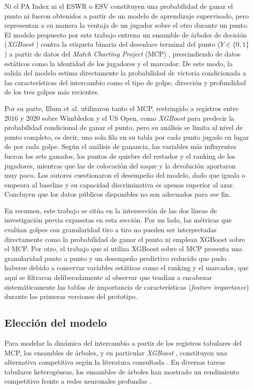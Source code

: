 \documentclass[journal]{IEEEtran}
\begin{document}
Ni el PA Index ni el ESWR o ESV constituyen una probabilidad de ganar el punto ni fueron obtenidos a partir de un modelo de aprendizaje supervisado, pero representan a su manera la ventaja de un jugador sobre el otro durante un punto. El modelo propuesto por este trabajo entrena un ensamble de árboles de decisión (\textit{XGBoost} \cite{chen2016xgboost}) contra la etiqueta binaria del desenlace terminal del punto ($Y \in \{0, 1\}$) a partir de datos del \textit{Match Charting Project} (MCP) \cite{sackmann2026mcp}, prescindiendo de datos estáticos como la identidad de los jugadores y el marcador. De este modo, la salida del modelo estima directamente la probabilidad de victoria condicionada a las características del intercambio como el tipo de golpe, dirección y profundidad de los tres golpes más recientes.

Por su parte, Illum et al. \cite{illum2025analysis} utilizaron tanto el MCP, restringido a registros entre 2016 y 2020 sobre Wimbledon y el US Open, como \textit{XGBoost} para predecir la probabilidad condicional de ganar el punto, pero su análisis se limita al nivel de punto completo, es decir, una sola fila en su tabla por cada punto jugado en lugar de por cada golpe. Según el análisis de ganancia, las variables más influyentes fueron los sets ganados, los puntos de quiebre del restador y el ranking de los jugadores, mientras que las de colocación del saque y la devolución aportaron muy poco. Los autores cuestionaron el desempeño del modelo, dado que iguala o empeora al baseline y su capacidad discriminativa es apenas superior al azar. Concluyen que los datos públicos disponibles no son adecuados para ese fin.

En resumen, este trabajo se sitúa en la intersección de las dos líneas de investigación previa expuestas en esta sección. Por un lado, las métricas que evalúan golpes con granularidad tiro a tiro no pueden ser interpretadas directamente como la probabilidad de ganar el punto ni emplean XGBoost sobre el MCP. Por otro, el trabajo que sí utiliza XGBoost sobre el MCP presenta una granularidad punto a punto y un desempeño predictivo reducido que pudo haberse debido a conservar variables estáticas como el ranking y el marcador, que aquí se filtraron deliberadamente al observar que tendían a encabezar sistemáticamente las tablas de importancia de características (\textit{feature importance}) durante las primeras versiones del prototipo.

\subsection{Elección del modelo}
Para modelar la dinámica del intercambio a partir de los registros tabulares del MCP, los ensambles de árboles, y en particular \textit{XGBoost} \cite{chen2016xgboost}, constituyen una alternativa competitiva según la literatura consultada \cite{hastie2009elements, grinsztajn2022tree}. En diversas tareas tabulares heterogéneas, los ensambles de árboles han mostrado un rendimiento competitivo frente a redes neuronales profundas \cite{grinsztajn2022tree, poudel2026unified}. 
\end{document}
